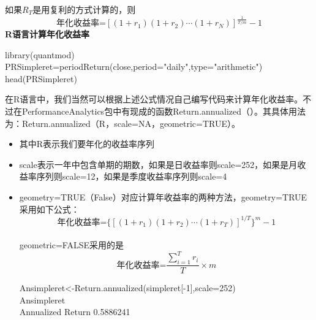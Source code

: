 \documentclass[a4paper,fontset=ubuntu,12pt]{ctexart}
\begin{document}
如果$R_T$是用复利的方式计算的，则$$\text{年化收益率=}[(1+r_1)(1+r_2)\cdots(1+r_N)]^\frac{1}{T/m}-1$$
\textbf{R语言计算年化收益率}

\begin{table}[h]
library(quantmod)\\
PRSimpleret=periodReturn(close,period="daily",type="arithmetic")\\
head(PRSimpleret)\\
\end{table}
在R语言中，我们当然可以根据上述公式情况自己编写代码来计算年化收益率。不过在PerformanceAnalytics包中有现成的函数Return.annualized（）。其具体用法为：Return.annualized（R，scale=NA，geometric=TRUE）。
\begin{itemize}
\item 其中R表示我们要年化的收益率序列
\item scale表示一年中包含单期的期数，如果是日收益率则scale=252，如果是月收益率序列则scale=12，如果是季度收益率序列则scale=4
\item geometry=TRUE（False）对应计算年收益率的两种方法，geometry=TRUE采用如下公式：
$$\text{年化收益率=}\{[(1+r_1)(1+r_2)\cdots(1+r_T)]^{1/T}\}^m-1$$\\
geometric=FALSE采用的是
$$\text{年化收益率=}\frac{\sum\nolimits_{i=1}^Tr_i}{T}\times m$$
\begin{table}[h]
Ansimpleret<-Return.annualized(simpleret[-1],scale=252) \\
Ansimpleret\\
Annualized Return 0.5886241\\
\end{table}

\end{itemize}
\end{document}
